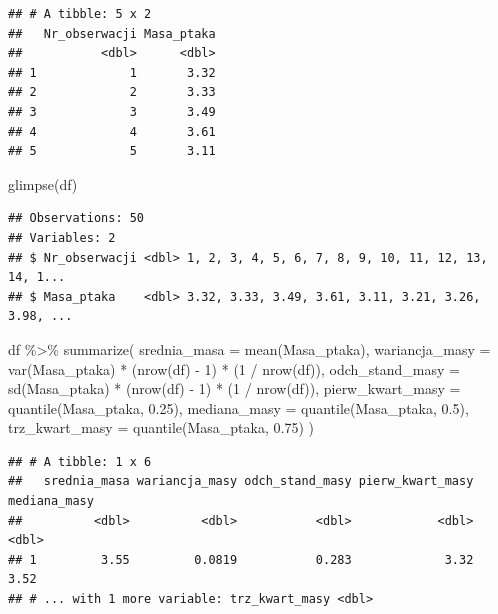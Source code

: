 \documentclass[]{article}
\newenvironment{Shaded}{\begin{snugshade}}{\end{snugshade}}
\newcommand{\AttributeTok}[1]{\textcolor[rgb]{0.77,0.63,0.00}{#1}}
\newcommand{\DecValTok}[1]{\textcolor[rgb]{0.00,0.00,0.81}{#1}}
\newcommand{\FloatTok}[1]{\textcolor[rgb]{0.00,0.00,0.81}{#1}}
\newcommand{\FunctionTok}[1]{\textcolor[rgb]{0.00,0.00,0.00}{#1}}
\newcommand{\NormalTok}[1]{#1}
\newcommand{\SpecialCharTok}[1]{\textcolor[rgb]{0.00,0.00,0.00}{#1}}
\begin{document}
\begin{verbatim}
## # A tibble: 5 x 2
##   Nr_obserwacji Masa_ptaka
##           <dbl>      <dbl>
## 1             1       3.32
## 2             2       3.33
## 3             3       3.49
## 4             4       3.61
## 5             5       3.11
\end{verbatim}

\begin{Shaded}
\begin{Highlighting}[]
\FunctionTok{glimpse}\NormalTok{(df)}
\end{Highlighting}
\end{Shaded}

\begin{verbatim}
## Observations: 50
## Variables: 2
## $ Nr_obserwacji <dbl> 1, 2, 3, 4, 5, 6, 7, 8, 9, 10, 11, 12, 13, 14, 1...
## $ Masa_ptaka    <dbl> 3.32, 3.33, 3.49, 3.61, 3.11, 3.21, 3.26, 3.98, ...
\end{verbatim}

\begin{Shaded}
\begin{Highlighting}[]
\NormalTok{df }\SpecialCharTok{\%\textgreater{}\%}
  \FunctionTok{summarize}\NormalTok{(}
    \AttributeTok{srednia\_masa =} \FunctionTok{mean}\NormalTok{(Masa\_ptaka),}
    \AttributeTok{wariancja\_masy =} \FunctionTok{var}\NormalTok{(Masa\_ptaka) }\SpecialCharTok{*}\NormalTok{ (}\FunctionTok{nrow}\NormalTok{(df) }\SpecialCharTok{{-}} \DecValTok{1}\NormalTok{) }\SpecialCharTok{*}\NormalTok{ (}\DecValTok{1} \SpecialCharTok{/} \FunctionTok{nrow}\NormalTok{(df)),}
    \AttributeTok{odch\_stand\_masy =} \FunctionTok{sd}\NormalTok{(Masa\_ptaka) }\SpecialCharTok{*}\NormalTok{ (}\FunctionTok{nrow}\NormalTok{(df) }\SpecialCharTok{{-}} \DecValTok{1}\NormalTok{) }\SpecialCharTok{*}\NormalTok{ (}\DecValTok{1} \SpecialCharTok{/} \FunctionTok{nrow}\NormalTok{(df)),}
    \AttributeTok{pierw\_kwart\_masy =} \FunctionTok{quantile}\NormalTok{(Masa\_ptaka, }\FloatTok{0.25}\NormalTok{),}
    \AttributeTok{mediana\_masy =} \FunctionTok{quantile}\NormalTok{(Masa\_ptaka, }\FloatTok{0.5}\NormalTok{), }
    \AttributeTok{trz\_kwart\_masy =} \FunctionTok{quantile}\NormalTok{(Masa\_ptaka, }\FloatTok{0.75}\NormalTok{) )}
\end{Highlighting}
\end{Shaded}

\begin{verbatim}
## # A tibble: 1 x 6
##   srednia_masa wariancja_masy odch_stand_masy pierw_kwart_masy mediana_masy
##          <dbl>          <dbl>           <dbl>            <dbl>        <dbl>
## 1         3.55         0.0819           0.283             3.32         3.52
## # ... with 1 more variable: trz_kwart_masy <dbl>
\end{verbatim}
\end{document}
